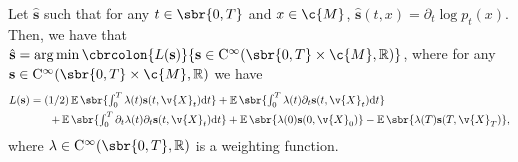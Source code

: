 \begin{proposition}
	\label{prop:loss-function_fisher}
	Let $\hat{\mathbf{s}}$ such that for any $t \in \sbr{0,T}$ and $x \in \c{M}$, $\hat{\mathbf{s}}(t,x) = \partial_t \log p_t(x)$.
	Then, we have that $\hat{\mathbf{s}} = \argmin \cbrcolon{L(\mathbf{s})}{\mathbf{s} \in \mathrm{C}^\infty(\sbr{0,T} \times \c{M}, \R)}$, where for any $\mathbf{s} \in \mathrm{C}^\infty(\sbr{0,T} \times \c{M}, \R)$ we have \begin{align} L(\mathbf{s}) &= \textstyle{(1/2) \E\sbr{\int_0^T \lambda(t) \mathbf{s}(t, \v{X}_t) \mathrm{d} t } + \E\sbr{\int_0^T \lambda(t) \partial_t \mathbf{s}(t, \v{X}_t) \mathrm{d} t}} \\ & \qquad \textstyle{ + \E\sbr{\int_0^T \partial_t \lambda(t) \partial_t \mathbf{s}(t, \v{X}_t) \mathrm{d} t} + \E\sbr{\lambda(0)\mathbf{s}(0, \v{X}_0)} - \E\sbr{\lambda(T)\mathbf{s}(T, \v{X}_T)} ,} \end{align} where $\lambda \in \mathrm{C}^\infty(\sbr{0,T}, \R)$ is a weighting function.
\end{proposition}

